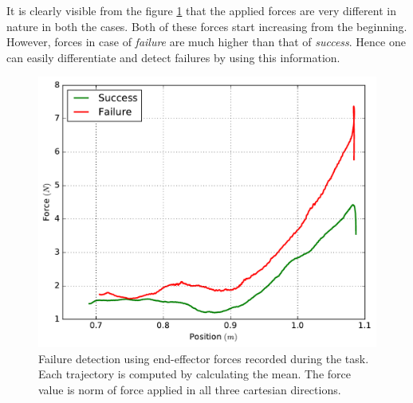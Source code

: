 \documentclass[sigconf]{acmart}
\begin{document}
It is clearly visible from the figure \ref{fig:position_force} that the applied forces are very different in nature in both the cases. Both of these forces start increasing from the beginning. However, forces in case of \textit{failure} are much higher than that of \textit{success}. Hence one can easily differentiate and detect failures by using this information.

\begin{figure}
	\includegraphics[width=.9\linewidth]{position_force}
	\caption{Failure detection using end-effector forces recorded during the task. Each trajectory is computed by calculating the mean. The force value is norm of force applied in all three cartesian directions.}
	\label{fig:position_force}
\end{figure}
\end{document}
